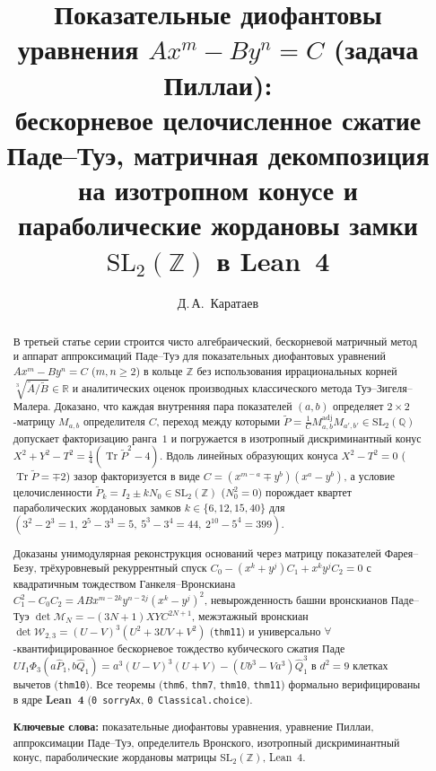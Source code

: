 \documentclass[11pt,a4paper]{article}
\title{\textbf{Показательные диофантовы уравнения $A x^m - B y^n = C$ (задача Пиллаи):\\ бескорневое целочисленное сжатие Паде--Туэ, матричная декомпозиция на изотропном конусе и параболические жордановы замки $\mathrm{SL}_2(\mathbb{Z})$ в Lean~4}}
\author{Д.\,А.~Каратаев}
\date{}
\theoremstyle{plain}
\theoremstyle{definition}
\begin{document}
\maketitle

\begin{abstract}
В третьей статье серии строится чисто алгебраический, бескорневой матричный метод и аппарат аппроксимаций Паде--Туэ для показательных диофантовых уравнений $A x^m - B y^n = C$ ($m,n\ge 2$) в кольце $\mathbb{Z}$ без использования иррациональных корней $\sqrt[3]{\widetilde{A}/\widetilde{B}}\in\mathbb{R}$ и аналитических оценок производных классического метода Туэ--Зигеля--Малера. Доказано, что каждая внутренняя пара показателей $(a,b)$ определяет $2\times 2$-матрицу $M_{a,b}$ определителя $C$, переход между которыми $\widetilde{P} = \frac{1}{C}M_{a,b}^{\mathrm{adj}}M_{a',b'}\in\mathrm{SL}_2(\mathbb{Q})$ допускает факторизацию ранга~$1$ и погружается в изотропный дискриминантный конус $X^2 + Y^2 - T^2 = \frac{1}{4}(\operatorname{Tr}\widetilde{P}^2 - 4)$. Вдоль линейных образующих конуса $X^2 - T^2 = 0$ ($\operatorname{Tr}\widetilde{P} = \mp 2$) зазор факторизуется в виде $C = (x^{m-a}\mp y^b)(x^a - y^b)$, а условие целочисленности $\widetilde{P}_k = I_2 \pm k N_0\in\mathrm{SL}_2(\mathbb{Z})$ ($N_0^2 = 0$) порождает квартет параболических жордановых замков $k\in\{6,12,15,40\}$ для $(3^2-2^3=1,\ 2^5-3^3=5,\ 5^3-3^4=44,\ 2^{10}-5^4=399)$.

Доказаны унимодулярная реконструкция оснований через матрицу показателей Фарея--Безу, трёхуровневый рекуррентный спуск $C_0 - (x^k+y^j)C_1 + x^k y^j C_2 = 0$ с квадратичным тождеством Ганкеля--Вронскиана $C_1^2 - C_0 C_2 = A B x^{m-2k}y^{n-2j}(x^k-y^j)^2$, невырожденность башни вронскианов Паде--Туэ $\det\mathcal{M}_N = -(3N+1)X Y C^{2N+1}$, межэтажный вронскиан $\det\mathcal{W}_{2,3} = (U-V)^3(U^2+3UV+V^2)$ (\texttt{thm11}) и универсально $\forall$-квантифицированное бескорневое тождество кубического сжатия Паде $U I_1 \Phi_3(a\widehat{P}_1, b\widehat{Q}_1) = a^3(U-V)^3(U+V) - (U b^3 - V a^3)\widehat{Q}_1^3$ в $d^2=9$ клетках вычетов (\texttt{thm10}). Все теоремы (\texttt{thm6}, \texttt{thm7}, \texttt{thm10}, \texttt{thm11}) формально верифицированы в ядре \textbf{Lean~4} (\texttt{0 sorryAx}, \texttt{0 Classical.choice}).

\medskip\noindent
\textbf{Ключевые слова:} показательные диофантовы уравнения, уравнение Пиллаи, аппроксимации Паде--Туэ, определитель Вронского, изотропный дискриминантный конус, параболические жордановы матрицы $\mathrm{SL}_2(\mathbb{Z})$, Lean~4.
\end{abstract}
\end{document}
